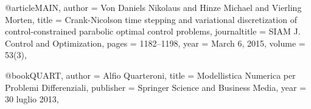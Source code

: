 @article{MAIN,
   author = {Von Daniels Nikolaus and Hinze Michael and Vierling Morten},
   title = {Crank-Nicolson time stepping and variational discretization of control-constrained parabolic optimal control problems},
   journaltitle = {SIAM J. Control and Optimization},
   pages = {1182–1198},
   year = {March 6, 2015},
   volume  = {53(3)},
}

@book{QUART,
	author = {Alfio Quarteroni},
	title = {Modellistica Numerica per Problemi Differenziali},
	publisher = {Springer Science and Business Media},
	year = {30 luglio 2013},
}

\begin{comment}
@article{Bergounioux1999,
author = {Bergounioux, Ma{\"{i}}tine and Ito, Kazufumi and Kunisch, Karl},
doi = {10.1137/S0363012997328609},
issn = {0363-0129},
journal = {SIAM Journal on Control and Optimization},
keywords = {1,49j20,49m29,active set,ams subject classifications,augmented lagrangian,in the recent past,introduction and formulation of,optimal control,pii,primal-dual method,s0363012997328609,sig-,the problem},
number = {4},
pages = {1176--1194},
title = {{Primal-Dual Strategy for Constrained Optimal Control Problems}},
volume = {37},
year = {1999}
}
@article{Brakerski2014,
author = {Brakerski, Zvika and Vaikuntanathan, Vinod},
keywords = {10,1137,120868669,68p25,94a60,ams subject classifications,cryptology,doi,errors,fully homomorphic encryption,learning with,private information retrieval,public-key encryption},
number = {2},
pages = {831--871},
title = {{Downloaded 03 / 29 / 16 to 131 . 180 . 145 . 249 . Redistribution subject to SIAM license or copyright ; see http://www.siam.org/journals/ojsa.php}},
volume = {43},
year = {2014}
}
@article{Cai1997,
author = {Cai, Z and Manteuffel, T A and Mccormick, S F},
journal = {SIAM Journal on Numerical Analysis},
keywords = {Stokes equations,least squares,multigrid},
number = {5},
pages = {1727--1741},
title = {{Downloaded 01 / 18 / 16 to 131 . 94 . 117 . 94 . Redistribution subject to SIAM license or copyright ; see http://www.siam.org/journals/ojsa.php}},
volume = {34},
year = {1997}
}


\end{comment}
